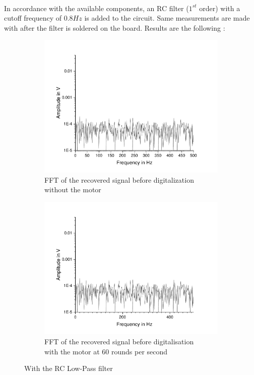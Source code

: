 \documentclass{article}[12pt]
\begin{document}
\paragraph{}
In accordance with the available components, an RC filter ($1^{st}$ order) with a cutoff frequency of $0.8Hz$ is added to the circuit. Same measurements are made with after the filter is soldered on the board. Results are the following : 
\begin{figure}[H]
\centering
\begin{subfigure}{.5\textwidth}
  \centering
  \includegraphics[width=\linewidth]{figures/nomotorfilter.pdf}
  \caption{FFT of the recovered signal before digitalization\\ without the motor}
  \label{fig:nomotornofilter2}
\end{subfigure}%
\begin{subfigure}{.5\textwidth}
  \centering
  \includegraphics[width=\linewidth]{figures/motorfilter.pdf}
  \caption{FFT of the recovered signal before digitalisation\\ with the motor at 60 rounds per second}
  \label{fig:motornofilter2}
\end{subfigure}
\caption{With the RC Low-Pass filter}
\label{fig:filterFFT}
\end{figure}
\end{document}
